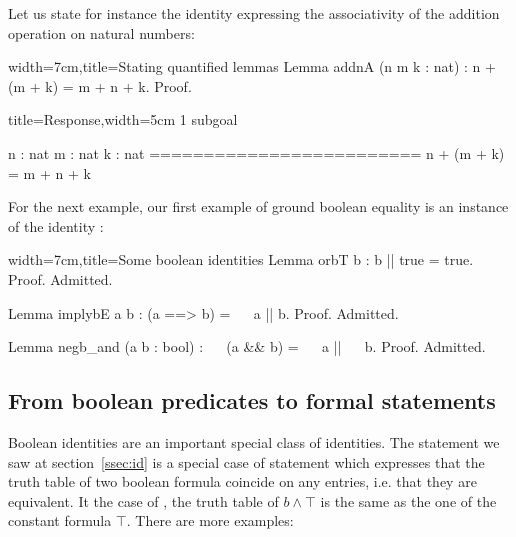 
Let us state for instance the identity expressing the associativity of
the  addition operation on natural numbers:

\begin{coq}{width=7cm,title=Stating quantified lemmas}
Lemma addnA (n m k : nat) :
  n + (m + k) = m + n + k.
Proof.
\end{coq}
\begin{coqout}{title=Response,width=5cm}
1 subgoal

 n : nat
 m : nat
 k : nat
 =========================
  n + (m + k) = m + n + k
\end{coqout}


For the next example, our first example of ground
boolean equality is an instance of the identity :

\begin{coq}{width=7cm,title=Some boolean identities}
Lemma orbT b : b || true = true.
Proof. Admitted.

Lemma implybE a b : (a ==> b) = ~~ a || b.
Proof. Admitted.

Lemma negb_and (a b : bool) : ~~ (a && b) = ~~ a || ~~ b.
Proof. Admitted.
\end{coq}



\subsection{From boolean predicates to formal statements}

Boolean identities are an important special class of identities. The
 statement we saw at section~\ref{ssec:id} is a special case
of statement which expresses that the truth table of two boolean
formula coincide on any entries, i.e. that they are equivalent. It the
case of , the truth table of $b \wedge \top$ is the same as
the one of the constant formula $\top$. There are more examples:

